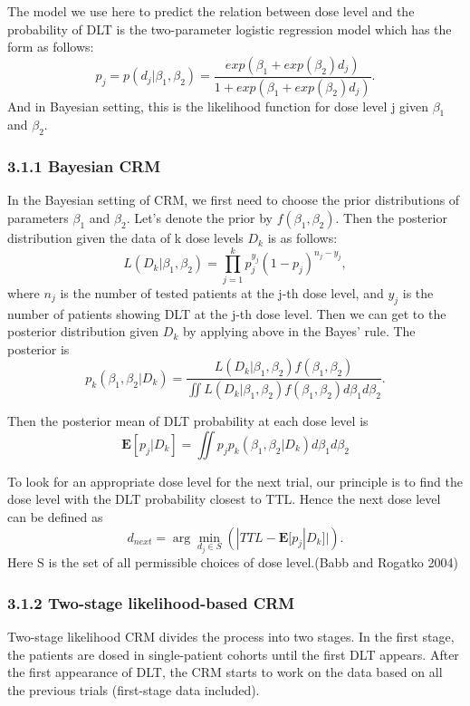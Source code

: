 \documentclass[
]{article}
\begin{document}
The model we use here to predict the relation between dose level and the
probability of DLT is the two-parameter logistic regression model which
has the form as follows:
\[p_j=p(d_j|\beta_1,\beta_2)=\frac{exp(\beta_1+exp(\beta_2)d_j)}{1+exp(\beta_1+exp(\beta_2)d_j)}.\]
And in Bayesian setting, this is the likelihood function for dose level
j given \(\beta_1\) and \(\beta_2\).

\hypertarget{bayesian-crm}{%
\subsubsection{3.1.1 Bayesian CRM}\label{bayesian-crm}}

In the Bayesian setting of CRM, we first need to choose the prior
distributions of parameters \(\beta_1\) and \(\beta_2\). Let's denote
the prior by \(f(\beta_1,\beta_2)\). Then the posterior distribution
given the data of k dose levels \(D_k\) is as follows:
\[L(D_k|\beta_1,\beta_2)=\prod_{j=1}^{k}p_j^{y_j}(1-p_j)^{n_j-y_j} ,\]
where \(n_j\) is the number of tested patients at the j-th dose level,
and \(y_j\) is the number of patients showing DLT at the j-th dose
level. Then we can get to the posterior distribution given \(D_k\) by
applying above in the Bayes' rule. The posterior is
\[p_k(\beta_1,\beta_2|D_k)=\frac{L(D_k|\beta_1,\beta_2)f(\beta_1,\beta_2)}{\iint L(D_k|\beta_1,\beta_2)f(\beta_1,\beta_2)d \beta_1 d \beta_2}.\]

Then the posterior mean of DLT probability at each dose level is
\[\mathbf{E}[p_j|D_k]=\iint p_j p_k(\beta_1,\beta_2|D_k)d \beta_1 d \beta_2\]

To look for an appropriate dose level for the next trial, our principle
is to find the dose level with the DLT probability closest to TTL. Hence
the next dose level can be defined as
\[d_{next}=\arg\min_{d_j\in S}(|TTL-\mathbf{E}[p_j|D_k]|).\] Here S is
the set of all permissible choices of dose level.(Babb and Rogatko 2004)

\hypertarget{two-stage-likelihood-based-crm}{%
\subsubsection{3.1.2 Two-stage likelihood-based
CRM}\label{two-stage-likelihood-based-crm}}

Two-stage likelihood CRM divides the process into two stages. In the
first stage, the patients are dosed in single-patient cohorts until the
first DLT appears. After the first appearance of DLT, the CRM starts to
work on the data based on all the previous trials (first-stage data
included).
\end{document}
